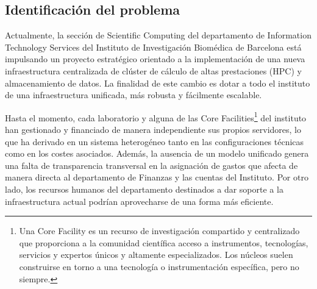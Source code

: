 \subsection{Identificación del problema}
Actualmente, la sección de Scientific Computing del departamento de Information Technology Services 
del Instituto de Investigación Biomédica de Barcelona está impulsando un proyecto estratégico orientado 
a la implementación de una nueva infraestructura centralizada de clúster de cálculo de altas prestaciones 
(HPC) y almacenamiento de datos. La finalidad de este cambio es dotar a todo el instituto de una 
infraestructura unificada, más robusta y fácilmente escalable.

Hasta el momento, cada laboratorio y alguna de las Core Facilities\footnote{Una Core Facility es un recurso 
de investigación compartido y centralizado que proporciona a la comunidad científica acceso a instrumentos, 
tecnologías, servicios y expertos únicos y altamente especializados. Los núcleos suelen construirse en torno 
a una tecnología o instrumentación específica, pero no siempre.} del instituto han gestionado y 
financiado de manera independiente sus propios servidores, lo que ha derivado en un sistema heterogéneo 
tanto en las configuraciones técnicas como en los costes asociados. Además, la ausencia de un modelo unificado 
genera una falta de transparencia transversal en la asignación de gastos que afecta de manera directa al departamento 
de Finanzas y las cuentas del Instituto. Por otro lado, los recursos humanos del departamento destinados 
a dar soporte a la infraestructura actual podrían aprovecharse de una forma más eficiente.